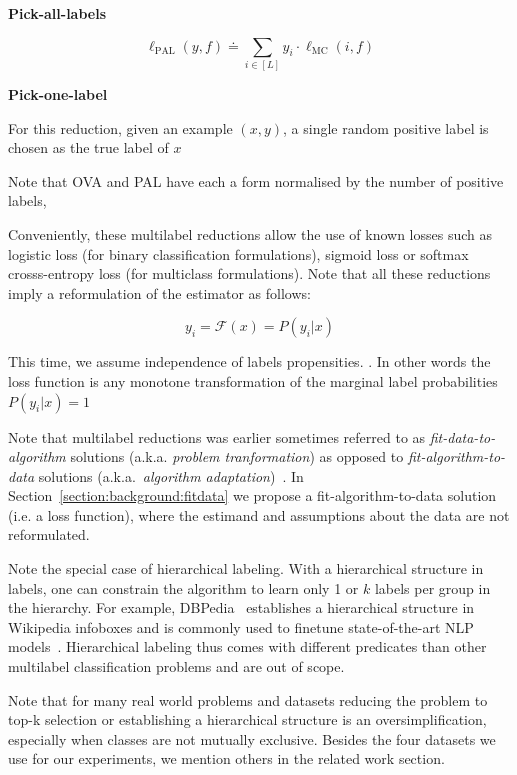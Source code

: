\textbf{Pick-all-labels}

\begin{equation}
\ell_{\mathrm{PAL}}(y, f) \doteq \sum_{i \in[L]} y_{i} \cdot \ell_{\mathrm{MC}}(i, f)
\end{equation}

\textbf{Pick-one-label}

For this reduction, given an example $(x,y)$, a single random positive label is chosen as the true label of $x$


Note that OVA and PAL have each a form normalised by the number of positive labels, 


Conveniently, these multilabel reductions allow the use of known losses such as logistic loss (for binary classification formulations), sigmoid loss or softmax crosss-entropy loss (for multiclass formulations). Note that all these reductions imply a reformulation of the estimator as follows:

\begin{equation}
  y_i = \mathcal{F}(x) = P(y_i | x)
\end{equation}

This time, we assume independence of labels propensities. .
In other words the loss function is any monotone transformation of the marginal label probabilities $ P(y_i | x) = 1$ ~\cite{OVA2, multilabelMetrics, unifiedView}


Note that multilabel reductions was earlier sometimes referred to as \emph{fit-data-to-algorithm} solutions (a.k.a. \emph{problem tranformation}) as opposed to \emph{fit-algorithm-to-data} solutions (a.k.a.\ \emph{algorithm adaptation})~\cite{multilabelReview, multilabelReview2}. In Section~\ref{section:background:fitdata} we propose a fit-algorithm-to-data solution (i.e. a loss function), where the estimand and assumptions about the data are not reformulated.

Note the special case of hierarchical labeling. With a hierarchical structure in labels, one can constrain the algorithm to learn only 1 or $k$ labels per group in the hierarchy. For example, DBPedia~\citep{lehmann2015dbpedia} establishes a hierarchical structure in Wikipedia infoboxes and is commonly used to finetune state-of-the-art NLP models~\citep[see, e.g.,][]{XLNet, ULMFit}. Hierarchical labeling thus comes with different predicates than other multilabel classification problems and are out of scope.

Note that for many real world problems and datasets reducing the problem to top-k selection or establishing a hierarchical structure is an oversimplification, especially when classes are not mutually exclusive. Besides the four datasets we use for our experiments, we mention others in the related work section.

